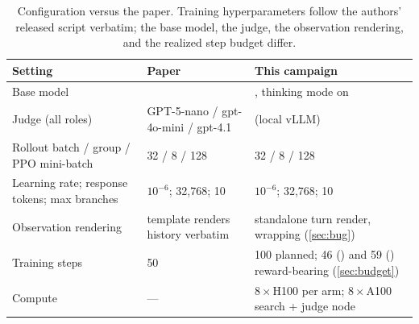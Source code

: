 \begin{table}[t]
\centering
\small
\begin{tabular}{p{4.2cm}p{3.6cm}p{6.6cm}}
\toprule
Setting & Paper & This campaign \\
\midrule
Base model & \seedoss{} & \qwen{}, thinking mode on \\
Judge (all roles) & GPT-5-nano / gpt-4o-mini / gpt-4.1 & \judgemodel{} (local vLLM) \\
Rollout batch / group / PPO mini-batch & 32 / 8 / 128 & 32 / 8 / 128 \\
Learning rate; response tokens; max branches & $10^{-6}$; 32{,}768; 10 & $10^{-6}$; 32{,}768; 10 \\
Observation rendering & template renders history verbatim & standalone turn render, \toolresp{} wrapping (\cref{sec:bug}) \\
Training steps & 50 & 100 planned; 46 (\foldgrpo{}) and 59 (\grpo{}) reward-bearing (\cref{sec:budget}) \\
Compute & --- & $8\times$H100 per arm; $8\times$A100 search + judge node \\
\bottomrule
\end{tabular}
\caption{Configuration versus the paper. Training hyperparameters follow the authors' released
script verbatim; the base model, the judge, the observation rendering, and the realized step
budget differ.}
\label{tab:config}
\end{table}
